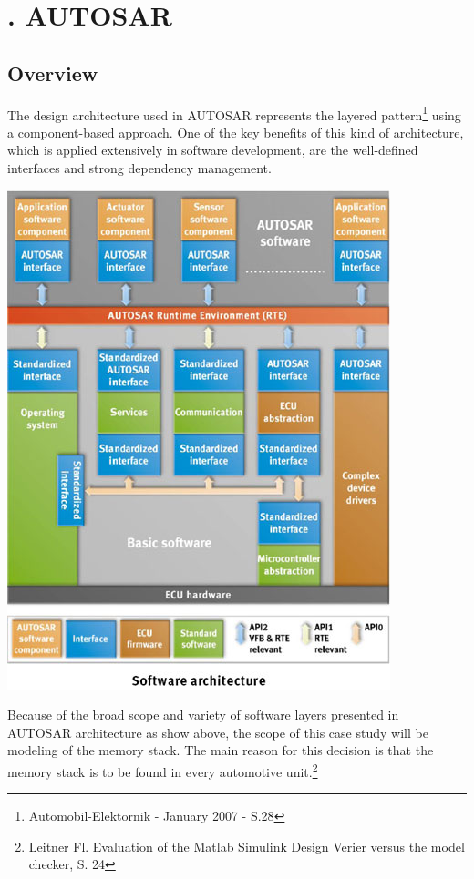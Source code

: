 \chapter[AUTOSAR]{\thechapter. AUTOSAR}
\section{Overview}
The design architecture used in AUTOSAR represents the layered pattern\footnote{Automobil-Elektornik - January 2007 - S.28} using a component-based approach. One of the key benefits of this kind of architecture, which is applied extensively in software development, are the well-defined interfaces and strong dependency management.\newline
\begin{center}
\includegraphics[scale=0.60]{Images/autosar_arch.jpg}\\
\end{center}
Because of the broad scope and variety of software layers presented in AUTOSAR architecture as show above, the scope of this case study will be modeling of the memory stack. The main reason for this decision is that the memory stack is to be found in every automotive unit.\footnote{Leitner Fl. Evaluation of the Matlab Simulink Design Verier versus the model checker, S. 24}\newpage
